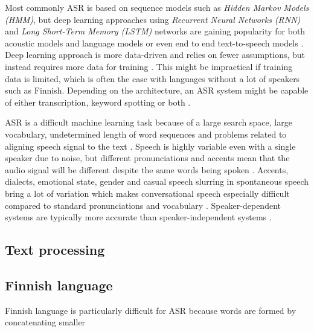 \documentclass[utf8,english]{gradu3}
\begin{document}
Most commonly ASR is based on sequence models such as \emph{Hidden Markov Models (HMM)}, but deep learning approaches using \emph{Recurrent Neural Networks (RNN)} and \emph{Long Short-Term Memory (LSTM)} networks are gaining popularity for both acoustic models and language models or even end to end text-to-speech models \parencite{bengioWordEmbeddingsSpeech2014,enarviAutomaticSpeechRecognition2017}. Deep learning approach is more data-driven and relies on fewer assumptions, but instead requires more data for training \parencite{bengioWordEmbeddingsSpeech2014}. This might be impractical if training data is limited, which is often the case with languages without a lot of speakers such as Finnish. Depending on the architecture, an ASR system might be capable of either transcription, keyword spotting or both \parencite{juangAutomaticSpeechRecognition2005,enarviAutomaticSpeechRecognition2017}.

ASR is a difficult machine learning task because of a large search space, large vocabulary, undetermined length of word sequences and problems related to aligning speech signal to the text \parencite{enarviAutomaticSpeechRecognition2017}. Speech is highly variable even with a single speaker due to noise, but different pronunciations and accents mean that the audio signal will be different despite the same words being spoken \parencite{juangAutomaticSpeechRecognition2005}. Accents, dialects, emotional state, gender and casual speech slurring in spontaneous speech bring a lot of variation which makes conversational speech especially difficult compared to standard pronunciations and vocabulary \parencite{benzeghibaAutomaticSpeechRecognition2007, juangAutomaticSpeechRecognition2005}. Speaker-dependent systems are typically more accurate than speaker-independent systems \parencite{benzeghibaAutomaticSpeechRecognition2007,enarviAutomaticSpeechRecognition2017}.





\subsection{Text processing}




\subsection{Finnish language}
Finnish language is particularly difficult for ASR because words are formed by concatenating smaller \parencite{enarviAutomaticSpeechRecognition2017}
\end{document}
